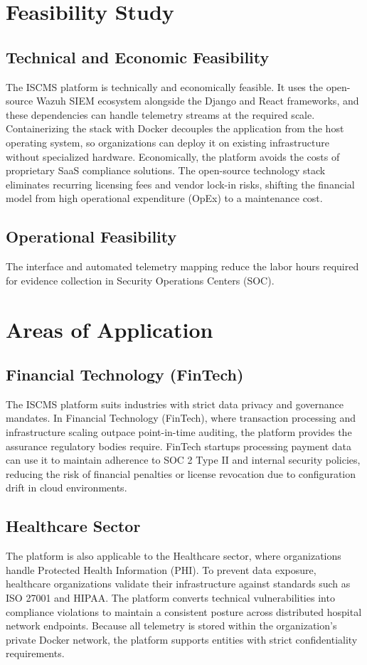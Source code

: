 \section{Feasibility Study}

\subsection{Technical and Economic Feasibility}
The ISCMS platform is technically and economically feasible. It uses the open-source Wazuh SIEM ecosystem alongside the Django and React frameworks, and these dependencies can handle telemetry streams at the required scale. Containerizing the stack with Docker decouples the application from the host operating system, so organizations can deploy it on existing infrastructure without specialized hardware. Economically, the platform avoids the costs of proprietary SaaS compliance solutions. The open-source technology stack eliminates recurring licensing fees and vendor lock-in risks, shifting the financial model from high operational expenditure (OpEx) to a maintenance cost.

\subsection{Operational Feasibility}
The interface and automated telemetry mapping reduce the labor hours required for evidence collection in Security Operations Centers (SOC).

\section{Areas of Application}

\subsection{Financial Technology (FinTech)}
The ISCMS platform suits industries with strict data privacy and governance mandates. In Financial Technology (FinTech), where transaction processing and infrastructure scaling outpace point-in-time auditing, the platform provides the assurance regulatory bodies require. FinTech startups processing payment data can use it to maintain adherence to SOC 2 Type II and internal security policies, reducing the risk of financial penalties or license revocation due to configuration drift in cloud environments.

\subsection{Healthcare Sector}
The platform is also applicable to the Healthcare sector, where organizations handle Protected Health Information (PHI). To prevent data exposure, healthcare organizations validate their infrastructure against standards such as ISO 27001 and HIPAA. The platform converts technical vulnerabilities into compliance violations to maintain a consistent posture across distributed hospital network endpoints. Because all telemetry is stored within the organization's private Docker network, the platform supports entities with strict confidentiality requirements.

